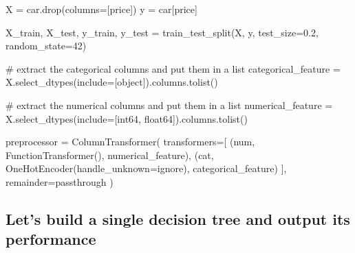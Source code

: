\documentclass[
  letterpaper,
  DIV=11,
  numbers=noendperiod]{scrreprt}
\newenvironment{Shaded}{\begin{snugshade}}{\end{snugshade}}
\newcommand{\CommentTok}[1]{\textcolor[rgb]{0.37,0.37,0.37}{#1}}
\newcommand{\DecValTok}[1]{\textcolor[rgb]{0.68,0.00,0.00}{#1}}
\newcommand{\FloatTok}[1]{\textcolor[rgb]{0.68,0.00,0.00}{#1}}
\newcommand{\NormalTok}[1]{\textcolor[rgb]{0.00,0.23,0.31}{#1}}
\newcommand{\OperatorTok}[1]{\textcolor[rgb]{0.37,0.37,0.37}{#1}}
\newcommand{\StringTok}[1]{\textcolor[rgb]{0.13,0.47,0.30}{#1}}
\begin{document}
\begin{Shaded}
\begin{Highlighting}[]
\NormalTok{X }\OperatorTok{=}\NormalTok{ car.drop(columns}\OperatorTok{=}\NormalTok{[}\StringTok{\textquotesingle{}price\textquotesingle{}}\NormalTok{])}
\NormalTok{y }\OperatorTok{=}\NormalTok{ car[}\StringTok{\textquotesingle{}price\textquotesingle{}}\NormalTok{]}

\NormalTok{X\_train, X\_test, y\_train, y\_test }\OperatorTok{=}\NormalTok{ train\_test\_split(X, y, test\_size}\OperatorTok{=}\FloatTok{0.2}\NormalTok{, random\_state}\OperatorTok{=}\DecValTok{42}\NormalTok{)}

\CommentTok{\# extract the categorical columns and put them in a list}
\NormalTok{categorical\_feature }\OperatorTok{=}\NormalTok{ X.select\_dtypes(include}\OperatorTok{=}\NormalTok{[}\StringTok{\textquotesingle{}object\textquotesingle{}}\NormalTok{]).columns.tolist()}

\CommentTok{\# extract the numerical columns and put them in a list}
\NormalTok{numerical\_feature }\OperatorTok{=}\NormalTok{ X.select\_dtypes(include}\OperatorTok{=}\NormalTok{[}\StringTok{\textquotesingle{}int64\textquotesingle{}}\NormalTok{, }\StringTok{\textquotesingle{}float64\textquotesingle{}}\NormalTok{]).columns.tolist()}
\end{Highlighting}
\end{Shaded}

\begin{Shaded}
\begin{Highlighting}[]
\NormalTok{preprocessor }\OperatorTok{=}\NormalTok{ ColumnTransformer(}
\NormalTok{    transformers}\OperatorTok{=}\NormalTok{[}
\NormalTok{        (}\StringTok{\textquotesingle{}num\textquotesingle{}}\NormalTok{, FunctionTransformer(), numerical\_feature),}
\NormalTok{        (}\StringTok{\textquotesingle{}cat\textquotesingle{}}\NormalTok{, OneHotEncoder(handle\_unknown}\OperatorTok{=}\StringTok{\textquotesingle{}ignore\textquotesingle{}}\NormalTok{), categorical\_feature)}
\NormalTok{    ],}
\NormalTok{    remainder}\OperatorTok{=}\StringTok{\textquotesingle{}passthrough\textquotesingle{}}
\NormalTok{)}
\end{Highlighting}
\end{Shaded}

\subsection{Let's build a single decision tree and output its
performance}\label{lets-build-a-single-decision-tree-and-output-its-performance}
\end{document}
